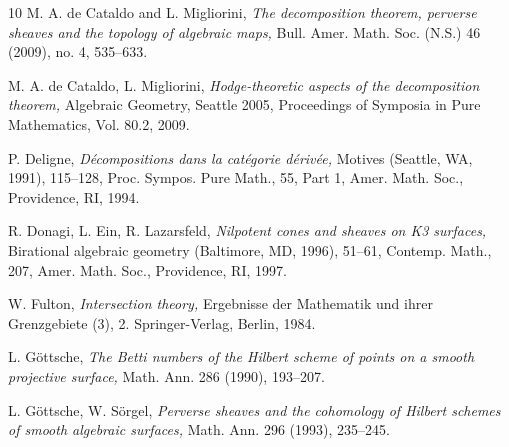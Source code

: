 \documentclass[11pt]{amsart}
\theoremstyle{plain}
\theoremstyle{definition}
\theoremstyle{remark}
\begin{document}
\begin{thebibliography}{10}
 M. A. de Cataldo and L. Migliorini, {\em The decomposition theorem, perverse sheaves and the topology of algebraic maps,} Bull. Amer. Math. Soc. (N.S.) 46 (2009), no. 4, 535--633.

 M. A. de Cataldo, L. Migliorini, {\em Hodge-theoretic aspects of the decomposition theorem,}
Algebraic Geometry, Seattle 2005, Proceedings of Symposia in Pure Mathematics, Vol.
80.2, 2009.



 P. Deligne, {\em D\'ecompositions dans la cat\'egorie d\'eriv\'ee,} Motives (Seattle, WA, 1991), 115--128, Proc. Sympos. Pure Math., 55, Part 1, Amer. Math. Soc., Providence, RI, 1994.

 R. Donagi, L. Ein, R. Lazarsfeld, {\em
Nilpotent cones and sheaves on K3 surfaces,} Birational algebraic geometry (Baltimore, MD, 1996), 51--61, Contemp. Math., 207, Amer. Math. Soc., Providence, RI, 1997. 


 W. Fulton, {\em Intersection theory,} Ergebnisse der Mathematik und ihrer Grenzgebiete (3), 2. Springer-Verlag, Berlin, 1984.







 L. G\"ottsche, {\em The Betti numbers of the Hilbert scheme of points on a smooth projective surface,} Math. Ann. 286 (1990), 193--207.

 L. G\"ottsche, W. S\"orgel, {\em Perverse sheaves and the cohomology of Hilbert schemes of smooth algebraic surfaces,} Math. Ann. 296 (1993), 235--245.


\end{thebibliography}
\end{document}
